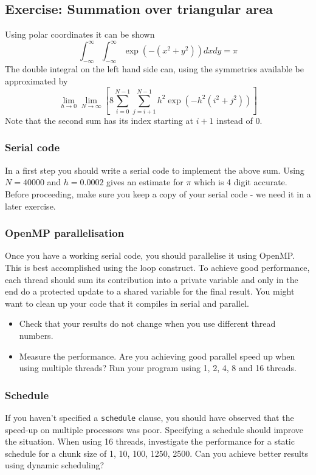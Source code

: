 \subsection{Exercise: Summation over triangular area}\label{triangularSumExercise}

Using polar coordinates it can be shown
\begin{equation}
\int_{-\infty}^\infty \int_{-\infty}^\infty \exp(-(x^2 +y^2)) dx dy = \pi
\end{equation}
The double integral on the left hand side can, using the symmetries available be approximated by
\begin{equation}
\lim_{h\to0}\lim_{N\to\infty}\left[
8\sum_{i=0}^{N-1}\sum_{j=i+1}^{N-1}
h^2 \exp\left(-h^2 (i^2 + j^2)
\right)\right]
\end{equation}
Note that the second sum has its index starting at $i+1$ instead of 0.

\subsubsection{Serial code}\label{triangularSumExercise_serial}
In a first step you should 
write a serial code to implement the above sum.
Using $N=40000$ and $h=0.0002$ gives an estimate for $\pi$ which is 4 digit accurate.  Before proceeding, make sure you keep a copy of your serial code - we need it in a later exercise.

\subsubsection{OpenMP parallelisation}
Once you have a working serial code, you should parallelise it using OpenMP.   This is best accomplished using the loop construct.  To achieve good performance, each thread should sum its contribution into a private variable and only in the end do a protected update to a shared variable for the final result. You might want to clean up your code that it compiles in serial and parallel.
\begin{itemize}
\item Check that your results do not change when you use different thread numbers.
\item Measure the performance.  Are you achieving good parallel speed up when using multiple threads?  Run your program using 1, 2, 4, 8 and 16 threads.
\end{itemize}

\subsubsection{Schedule}
If you haven't specified a \verb+schedule+ clause, you should have observed that the speed-up on multiple processors was poor.  Specifying a schedule should improve the situation.  When using 16 threads, investigate the performance for a static schedule for a chunk size of 1, 10, 100, 1250, 2500.  Can you achieve better results using dynamic scheduling?

